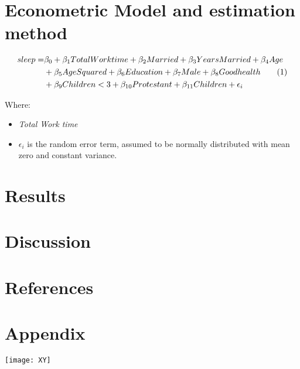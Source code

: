 \documentclass[12pt]{article}%
\newcommand\numberthis{\addtocounter{equation}{1}\tag{\theequation}}
\begin{document}
\bigskip

\section{Econometric Model and estimation method}

\begin{align*}
sleep  =&  \beta_{0} + \beta_{1}Total Work time + \beta_{2}Married + \beta_{3}Years Married + \beta_{4}Age \\
& + \beta_{5}Age Squared + \beta_{6}Education + \beta_{7}Male + \beta_{8}Good health  \numberthis \\
& + \beta_{9}Children<3 + \beta_{10}Protestant + \beta_{11} Children + \epsilon_{i}   
\end{align*}


Where: 
\begin{itemize}
\item \textit{Total Work time} 
\item $\epsilon_{i}$ is the random error term, assumed to be normally distributed with mean zero and constant variance. 
\end{itemize}


\section{Results}


\section{Discussion}


\newpage

\section{References}




\section*{Appendix}


\texttt{[image: XY]} 


 
\end{document}
